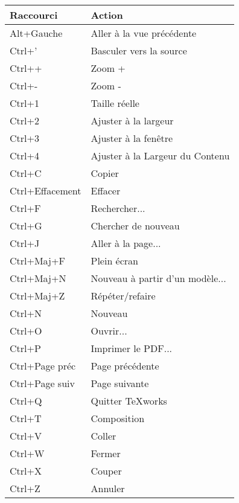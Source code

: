 \begin{longtable}{Pl}
\toprule
Raccourci       & Action \\
\midrule \endhead
Alt+Gauche      & Aller à la vue précédente \\
Ctrl+'          & Basculer vers la source \\
Ctrl++          & Zoom + \\
Ctrl+{-}        & Zoom {-} \\
Ctrl+1          & Taille réelle \\
Ctrl+2          & Ajuster à la largeur \\
Ctrl+3          & Ajuster à la fenêtre \\
Ctrl+4          & Ajuster à la Largeur du Contenu \\
Ctrl+C          & Copier \\
Ctrl+Effacement & Effacer \\
Ctrl+F          & Rechercher... \\
Ctrl+G          & Chercher de nouveau \\
Ctrl+J          & Aller à la page... \\
Ctrl+Maj+F      & Plein écran \\
Ctrl+Maj+N      & Nouveau à partir d'un modèle... \\
Ctrl+Maj+Z      & Répéter/refaire \\
Ctrl+N          & Nouveau \\
Ctrl+O          & Ouvrir... \\
Ctrl+P          & Imprimer le PDF... \\
Ctrl+Page préc  & Page précédente \\
Ctrl+Page suiv  & Page suivante \\
Ctrl+Q          & Quitter TeXworks \\
Ctrl+T          & Composition \\
Ctrl+V          & Coller \\
Ctrl+W          & Fermer \\
Ctrl+X          & Couper \\
Ctrl+Z          & Annuler \\
\bottomrule
\end{longtable}

